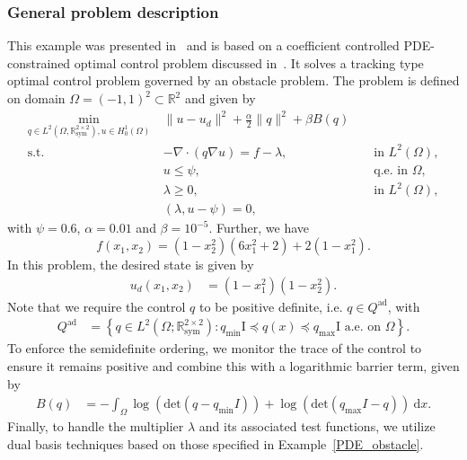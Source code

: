 \subsubsection{General problem description}
This example was presented in~\cite{HehlKhiminNeitzelSimonWickWollner:2023} and is based on a coefficient controlled
PDE-constrained optimal control problem discussed in~\cite{DeckelnickHinze:2011}.
It solves a tracking type optimal control problem governed by an obstacle problem. The problem is defined on domain
$\Omega = (-1, 1)^2 \subset \mathbb{R}^2$ and given by
\begin{equation*}
    \begin{aligned}
        \min_{q \in L^2(\Omega, \mathbb{R}^{2 \times 2}_{\text{sym}}),u \in H_0^1 \left( \Omega \right) } ~ &\|u - u_d \|^2 + \frac{\alpha}{2} \| q \|^2 + \beta B(q) && \\
        \text{s.t. } &- \nabla \cdot \left( q \nabla u \right) = f - \lambda, &&  \text{ in } L^2 \left( \Omega \right),\\
        &u \leq \psi, && \text{ q.e. in } \Omega,\\
        &\lambda \geq 0, && \text{ in } L^2 \left( \Omega \right),\\
        &\left( \lambda, u-\psi \right) = 0,
    \end{aligned}
\end{equation*}
with $\psi = 0.6$, $\alpha = 0.01$ and $\beta = 10^{-5}$. Further, we have
\begin{equation*}
    f(x_1,x_2)=\left( 1 - x_2^2 \right) \left( 6x_1^2 + 2 \right) + 2
    \left( 1-x_1^2 \right).
\end{equation*}
In this problem, the desired state is given by
  \begin{equation*}
    \begin{aligned}
      u_d(x_1, x_2) &= (1-x_1^2)(1-x_2^2).
    \end{aligned}
  \end{equation*}
Note that we require the control $q$ to be positive definite, i.e. $q \in Q^{\textrm{ad}}$, with
\begin{equation*}
    \begin{aligned}
        Q^{\textrm{ad}} &= \left\{ q \in L^{2} \left( \Omega; \mathbb{R}_{\textrm{sym}}^{2 \times 2} \right)
              : q_{\min} \textrm{I} \preccurlyeq q(x) \preccurlyeq q_{\max}
              \textrm{I} \text{ a.e. on } \Omega \right\}.
    \end{aligned}
\end{equation*}
To enforce the semidefinite ordering, we monitor the trace of the control to ensure it remains positive and combine
this with a logarithmic barrier term, given by
  \begin{align*}
    B(q) &= - \int_\Omega \log \left( \textrm{det} \left( q - q_{\min} I
      \right) \right) + \log \left( \textrm{det} \left( q_{\max} I - q
      \right) \right) ~\textrm{d}x.
  \end{align*}
Finally, to handle the multiplier $\lambda$ and its associated test functions, we utilize dual basis techniques based
on those specified in Example~\ref{PDE_obstacle}.